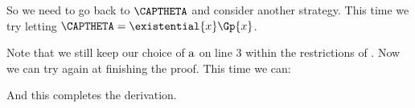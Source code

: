So we need to go back to $\CAPTHETA$ and consider another strategy. 
This time we try letting $\CAPTHETA=\existential{\variable{x}}\Gp{\variable{x}}$.
\begin{gproof}[\label{GQDExampleL}]
\end{gproof}
Note that we still keep our choice of $\mathrm{a}$ on line 3 within the restrictions of . 
Now we can try again at finishing the proof. 
This time we can:
\begin{gproof}[\label{GQDExampleM}]
\end{gproof}
And this completes the derivation. 

